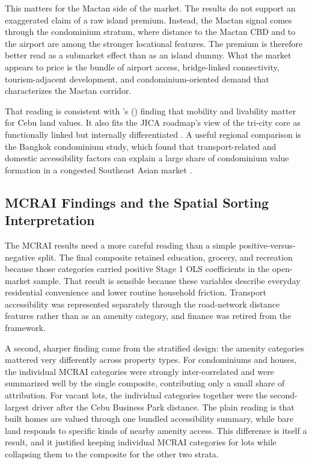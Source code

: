 This matters for the Mactan side of the market. The results do not support an exaggerated claim of a raw island premium. Instead, the Mactan signal comes through the condominium stratum, where distance to the Mactan CBD and to the airport are among the stronger locational features. The premium is therefore better read as a submarket effect than as an island dummy. What the market appears to price is the bundle of airport access, bridge-linked connectivity, tourism-adjacent development, and condominium-oriented demand that characterizes the Mactan corridor.

That reading is consistent with \citeauthor{agosto2020}'s (\citeyear{agosto2020}) finding that mobility and livability matter for Cebu land values. It also fits the JICA roadmap's view of the tri-city core as functionally linked but internally differentiated \parencite{jica2015metrocebu}. A useful regional comparison is the Bangkok condominium study, which found that transport-related and domestic accessibility factors can explain a large share of condominium value formation in a congested Southeast Asian market \parencite{tochaiwat2023thai}.

\subsection{MCRAI Findings and the Spatial Sorting Interpretation}\label{mcrai-findings-and-the-spatial-sorting-interpretation}

The MCRAI results need a more careful reading than a simple positive-versus-negative split. The final composite retained education, grocery, and recreation because those categories carried positive Stage 1 OLS coefficients in the open-market sample. That result is sensible because these variables describe everyday residential convenience and lower routine household friction. Transport accessibility was represented separately through the road-network distance features rather than as an amenity category, and finance was retired from the framework.

A second, sharper finding came from the stratified design: the amenity categories mattered very differently across property types. For condominiums and houses, the individual MCRAI categories were strongly inter-correlated and were summarized well by the single composite, contributing only a small share of attribution. For vacant lots, the individual categories together were the second-largest driver after the Cebu Business Park distance. The plain reading is that built homes are valued through one bundled accessibility summary, while bare land responds to specific kinds of nearby amenity access. This difference is itself a result, and it justified keeping individual MCRAI categories for lots while collapsing them to the composite for the other two strata.

